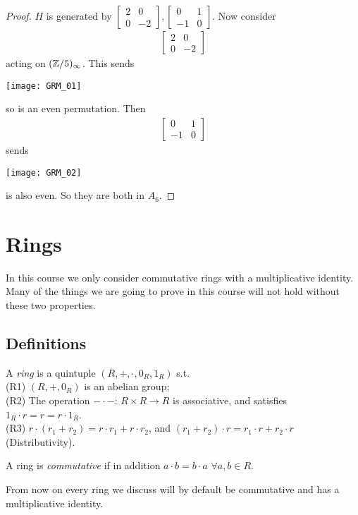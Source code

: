 \documentclass[a4paper]{article}
\begin{document}
\begin{eg}
\begin{proof}
$H$ is generated by $\left[\begin{matrix}
2 & 0\\
0 & -2
\end{matrix}\right],\left[\begin{matrix}
0 & 1\\
-1 & 0
\end{matrix}\right]$. Now consider
\begin{equation*}
\begin{aligned}
\left[\begin{matrix}
2 & 0\\
0 & -2
\end{matrix}\right]
\end{aligned}
\end{equation*} acting on $(\mathbb{Z}/5)_\infty$. This sends

\texttt{[image: GRM\_01]}

so is an even permutation. Then
\begin{equation*}
\begin{aligned}
\left[\begin{matrix}
0 & 1\\
-1 & 0
\end{matrix}\right]
\end{aligned}
\end{equation*} 
sends

\texttt{[image: GRM\_02]}

is also even. So they are both in $A_6$.

\end{proof}
\end{eg}

\newpage

\section{Rings}

In this course we only consider commutative rings with a multiplicative identity. Many of the things we are going to prove in this course will not hold without these two properties.

\subsection{Definitions}
\begin{defi}
A \emph{ring} is a quintuple $(R,+,\cdot,0_R,1_R)$ s.t. \\
(R1) $(R,+,0_R)$ is an abelian group;\\
(R2) The operation $- \cdot -$: $R \times R \to R$ is associative, and satisfies $1_R \cdot r = r = r \cdot 1_R$.\\
(R3) $r \cdot (r_1+r_2) = r \cdot r_1 + r \cdot r_2$, and $(r_1+r_2) \cdot r = r_1 \cdot r + r_2 \cdot r$ (Distributivity).

A ring is \emph{commutative} if in addition $a \cdot b = b \cdot a$ $\forall a,b \in R$.

From now on every ring we discuss will by default be commutative and has a multiplicative identity.
\end{defi}
\end{document}
